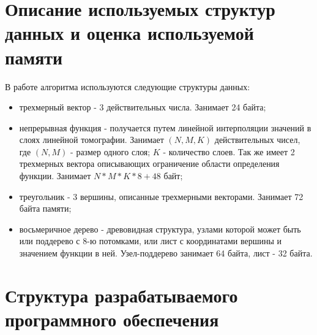 


\clearpage

\section{Описание используемых структур данных и оценка используемой памяти}

В работе алгоритма используются следующие структуры данных:
\begin{itemize}
    \item трехмерный вектор - 3 действительных числа. Занимает 24 байта;
    \item непрерывная функция - получается путем линейной интерполяции значений в слоях линейной томографии. Занимает $(N, M, K)$ действительных чисел, где $(N, M)$ - размер одного слоя; $K$ - количество слоев. Так же имеет 2 трехмерных вектора описывающих ограничение области определения функции. Занимает $N*M*K*8 + 48$ байт;
    \item треугольник - 3 вершины, описанные трехмерными векторами. Занимает 72 байта памяти;
    \item восьмеричное дерево - древовидная структура, узлами которой может быть или поддерево с 8-ю потомками, или лист с координатами вершины и значением функции в ней. Узел-поддерево занимает 64 байта, лист - 32 байта.
\end{itemize}


\section{Структура разрабатываемого программного обеспечения}

